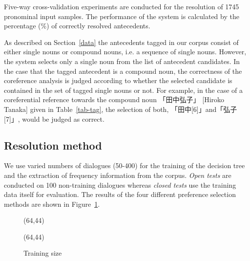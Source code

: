 Five-way cross-validation experiments are conducted for the resolution of 1745 pronominal
input samples. The performance of the system is calculated by the percentage (\%) of correctly
resolved antecedents.

As described on Section~\ref{data} the antecedents tagged in our corpus consist
of either single nouns or compound nouns, i.e. a sequence of single nouns.
However, the system selects only a single noun from the list of antecedent candidates. 
In the case that the tagged antecedent is a compound noun, the correctness of the coreference
analysis is judged according to whether the selected candidate is contained in the set
of tagged single nouns or not. For example, in the case of a coreferential reference towards
the compound noun 「田中弘子」 [Hiroko Tanaka] given in Table~\ref{tab-tag}, the selection of both,
「田中[6]」and「弘子[7]」, would be judged as correct.

\subsection{Resolution method}
\label{size}

We use varied numbers of dialogues (50-400) for the training of the decision tree and
the extraction of frequency information from the corpus. {\em Open tests} are conducted on
100 non-training dialogues whereas {\em closed tests} use the training data itself for evaluation.
The results of the four different preference selection methods are shown
in Figure~\ref{pic-size}.

\begin{figure}[htb]
  \begin{center}
    \vspace*{-1\baselineskip}

\begin{minipage}{.5\linewidth}
        \begin{center}
                 \atari(64,44)
        \end{center}
\end{minipage}
\begin{minipage}{.4\linewidth}
        \begin{center}
                 \atari(64,44)
        \end{center}
\end{minipage}

    \vspace*{-0.25\baselineskip}
   \caption{Training size}\label{pic-size}
  \vspace*{-1.5\baselineskip}
  \end{center}
\end{figure}

